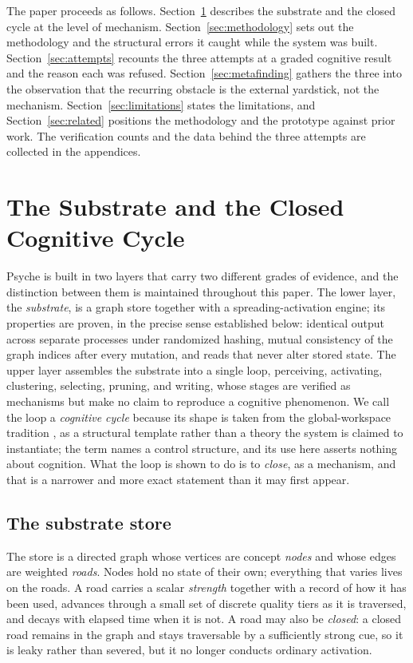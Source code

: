 \documentclass[11pt]{article}
\begin{document}
The paper proceeds as follows. Section~\ref{sec:substrate} describes the substrate and the
closed cycle at the level of mechanism. Section~\ref{sec:methodology} sets out the
methodology and the structural errors it caught while the system was built.
Section~\ref{sec:attempts} recounts the three attempts at a graded cognitive result and the
reason each was refused. Section~\ref{sec:metafinding} gathers the three into the
observation that the recurring obstacle is the external yardstick, not the mechanism.
Section~\ref{sec:limitations} states the limitations, and Section~\ref{sec:related}
positions the methodology and the prototype against prior work. The verification counts and
the data behind the three attempts are collected in the appendices.

\section{The Substrate and the Closed Cognitive Cycle}\label{sec:substrate}

Psyche is built in two layers that carry two different grades of evidence, and the
distinction between them is maintained throughout this paper. The lower layer, the
\emph{substrate}, is a graph store together with a spreading-activation engine; its
properties are proven, in the precise sense established below: identical output
across separate processes under randomized hashing, mutual consistency of the graph
indices after every mutation, and reads that never alter stored state. The upper
layer assembles the substrate into a single loop, perceiving, activating,
clustering, selecting, pruning, and writing, whose stages are verified as mechanisms
but make no claim to reproduce a cognitive phenomenon. We call the loop a
\emph{cognitive cycle} because its shape is taken from the global-workspace tradition
\citep{baars1988cognitive, franklin2014lida}, as a structural template rather than a
theory the system is claimed to instantiate; the term names a control structure, and
its use here asserts nothing about cognition. What the loop is shown to do is to
\emph{close}, as a mechanism, and that is a narrower and more exact statement than it
may first appear.

\subsection{The substrate store}

The store is a directed graph whose vertices are concept \emph{nodes} and whose edges
are weighted \emph{roads}. Nodes hold no state of their own; everything that varies
lives on the roads. A road carries a scalar \emph{strength} together with a record of
how it has been used, advances through a small set of discrete quality tiers as it is
traversed, and decays with elapsed time when it is not. A road may also be
\emph{closed}: a closed road remains in the graph and stays traversable by a
sufficiently strong cue, so it is leaky rather than severed, but it no longer conducts
ordinary activation.
\end{document}
